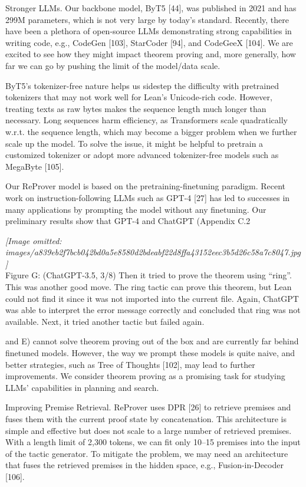 \documentclass[
]{article}
\begin{document}
Stronger LLMs. Our backbone model, ByT5 {[}44{]}, was published in 2021
and has 299M parameters, which is not very large by today's standard.
Recently, there have been a plethora of open-source LLMs demonstrating
strong capabilities in writing code, e.g., CodeGen {[}103{]}, StarCoder
{[}94{]}, and CodeGeeX {[}104{]}. We are excited to see how they might
impact theorem proving and, more generally, how far we can go by pushing
the limit of the model/data scale.

ByT5's tokenizer-free nature helps us sidestep the difficulty with
pretrained tokenizers that may not work well for Lean's Unicode-rich
code. However, treating texts as raw bytes makes the sequence length
much longer than necessary. Long sequences harm efficiency, as
Transformers scale quadratically w.r.t. the sequence length, which may
become a bigger problem when we further scale up the model. To solve the
issue, it might be helpful to pretrain a customized tokenizer or adopt
more advanced tokenizer-free models such as MegaByte {[}105{]}.

Our ReProver model is based on the pretraining-finetuning paradigm.
Recent work on instruction-following LLMs such as GPT-4 {[}27{]} has led
to successes in many applications by prompting the model without any
finetuning. Our preliminary results show that GPT-4 and ChatGPT
(Appendix C.2

\textit{[Image omitted: images/a839eb2f7bcb042bd0a5e8580d2bdeabf22d8ffa43152eec3b5d26c58a7c8047.jpg]}\\
Figure G: (ChatGPT-3.5, 3/8) Then it tried to prove the theorem using
``ring''. This was another good move. The ring tactic can prove this
theorem, but Lean could not find it since it was not imported into the
current file. Again, ChatGPT was able to interpret the error message
correctly and concluded that ring was not available. Next, it tried
another tactic but failed again.

and E) cannot solve theorem proving out of the box and are currently far
behind finetuned models. However, the way we prompt these models is
quite naive, and better strategies, such as Tree of Thoughts {[}102{]},
may lead to further improvements. We consider theorem proving as a
promising task for studying LLMs' capabilities in planning and search.

Improving Premise Retrieval. ReProver uses DPR {[}26{]} to retrieve
premises and fuses them with the current proof state by concatenation.
This architecture is simple and effective but does not scale to a large
number of retrieved premises. With a length limit of 2,300 tokens, we
can fit only 10--15 premises into the input of the tactic generator. To
mitigate the problem, we may need an architecture that fuses the
retrieved premises in the hidden space, e.g., Fusion-in-Decoder
{[}106{]}.
\end{document}
